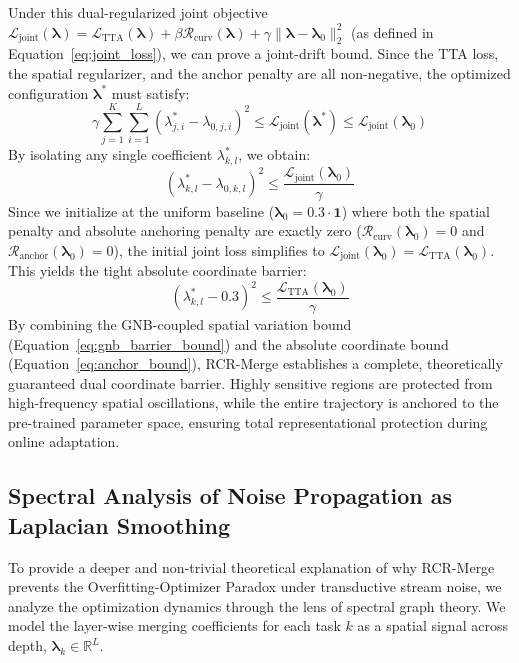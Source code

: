 Under this dual-regularized joint objective $\mathcal{L}_{\text{joint}}(\boldsymbol{\lambda}) = \mathcal{L}_{\text{TTA}}(\boldsymbol{\lambda}) + \beta \mathcal{R}_{\text{curv}}(\boldsymbol{\lambda}) + \gamma \|\boldsymbol{\lambda} - \boldsymbol{\lambda}_0\|_2^2$ (as defined in Equation~\ref{eq:joint_loss}), we can prove a joint-drift bound. Since the TTA loss, the spatial regularizer, and the anchor penalty are all non-negative, the optimized configuration $\boldsymbol{\lambda}^*$ must satisfy:
\begin{equation}
\gamma \sum_{j=1}^K \sum_{i=1}^L (\lambda^*_{j, i} - \lambda_{0, j, i})^2 \le \mathcal{L}_{\text{joint}}(\boldsymbol{\lambda}^*) \le \mathcal{L}_{\text{joint}}(\boldsymbol{\lambda}_0)
\end{equation}
By isolating any single coefficient $\lambda^*_{k, l}$, we obtain:
\begin{equation}
(\lambda^*_{k, l} - \lambda_{0, k, l})^2 \le \frac{\mathcal{L}_{\text{joint}}(\boldsymbol{\lambda}_0)}{\gamma}
\end{equation}
Since we initialize at the uniform baseline ($\boldsymbol{\lambda}_0 = 0.3 \cdot \mathbf{1}$) where both the spatial penalty and absolute anchoring penalty are exactly zero ($\mathcal{R}_{\text{curv}}(\boldsymbol{\lambda}_0) = 0$ and $\mathcal{R}_{\text{anchor}}(\boldsymbol{\lambda}_0) = 0$), the initial joint loss simplifies to $\mathcal{L}_{\text{joint}}(\boldsymbol{\lambda}_0) = \mathcal{L}_{\text{TTA}}(\boldsymbol{\lambda}_0)$. This yields the tight absolute coordinate barrier:
\begin{equation}
\label{eq:anchor_bound}
(\lambda^*_{k, l} - 0.3)^2 \le \frac{\mathcal{L}_{\text{TTA}}(\boldsymbol{\lambda}_0)}{\gamma}
\end{equation}
By combining the GNB-coupled spatial variation bound (Equation~\ref{eq:gnb_barrier_bound}) and the absolute coordinate bound (Equation~\ref{eq:anchor_bound}), RCR-Merge establishes a complete, theoretically guaranteed dual coordinate barrier. Highly sensitive regions are protected from high-frequency spatial oscillations, while the entire trajectory is anchored to the pre-trained parameter space, ensuring total representational protection during online adaptation.

\subsection{Spectral Analysis of Noise Propagation as Laplacian Smoothing}
To provide a deeper and non-trivial theoretical explanation of why RCR-Merge prevents the Overfitting-Optimizer Paradox under transductive stream noise, we analyze the optimization dynamics through the lens of spectral graph theory. We model the layer-wise merging coefficients for each task $k$ as a spatial signal across depth, $\boldsymbol{\lambda}_k \in \mathbb{R}^L$. 

